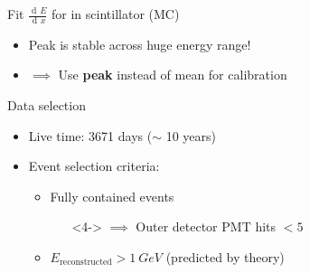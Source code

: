 \documentclass[14pt]{beamer}
\newcommand{\der}[2]{\frac{\operatorname{d\!}{}#1}{\operatorname{d\!}{}#2}}
\begin{document}
\begin{frame}{Fit $\der{E}{x}$ for \Pmu in scintillator (MC)}
	\centering
	\begin{itemize}
		\item<2-> Peak is stable across huge energy range!
		\item<3-> $\implies$ Use \textbf{peak} instead of mean for calibration
	\end{itemize}
\end{frame}

\begin{frame}{Data selection}
	\begin{itemize}
		\item<1-> Live time: 3671 days ($\sim$ 10 years)
		\item<2-> Event selection criteria:
			\begin{itemize}
				\item<3-> Fully contained events
					\begin{itemize}
						\item[]<4-> $\implies$ Outer detector PMT hits $< 5$
					\end{itemize}
				\item<5-> $E_{\text{reconstructed}} > \SI{1}{GeV}$ (predicted by
					theory)
			\end{itemize}
	\end{itemize}
\end{frame}
\end{document}
